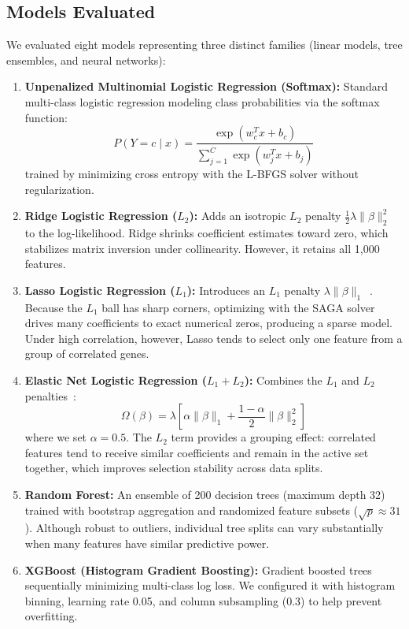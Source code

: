 \documentclass[11pt,a4paper]{article}
\begin{document}
\subsection{Models Evaluated}
We evaluated eight models representing three distinct families (linear models, tree ensembles, and neural networks):
\begin{enumerate}
    \item \textbf{Unpenalized Multinomial Logistic Regression (Softmax):} Standard multi-class logistic regression modeling class probabilities via the softmax function:
    \begin{equation}
        P(Y = c \mid x) = \frac{\exp(w_c^T x + b_c)}{\sum_{j=1}^C \exp(w_j^T x + b_j)}
    \end{equation}
    trained by minimizing cross entropy with the L-BFGS solver without regularization.
    \item \textbf{Ridge Logistic Regression ($L_2$):} Adds an isotropic $L_2$ penalty $\frac{1}{2}\lambda \|\beta\|_2^2$ to the log-likelihood. Ridge shrinks coefficient estimates toward zero, which stabilizes matrix inversion under collinearity. However, it retains all 1,000 features.
    \item \textbf{Lasso Logistic Regression ($L_1$):} Introduces an $L_1$ penalty $\lambda \|\beta\|_1$~\cite{tibshirani1996regression}. Because the $L_1$ ball has sharp corners, optimizing with the SAGA solver drives many coefficients to exact numerical zeros, producing a sparse model. Under high correlation, however, Lasso tends to select only one feature from a group of correlated genes.
    \item \textbf{Elastic Net Logistic Regression ($L_1 + L_2$):} Combines the $L_1$ and $L_2$ penalties~\cite{zou2005regularization}:
    \begin{equation}
        \Omega(\beta) = \lambda \left[ \alpha \|\beta\|_1 + \frac{1 - \alpha}{2} \|\beta\|_2^2 \right]
    \end{equation}
    where we set $\alpha = 0.5$. The $L_2$ term provides a grouping effect: correlated features tend to receive similar coefficients and remain in the active set together, which improves selection stability across data splits.
    \item \textbf{Random Forest:} An ensemble of 200 decision trees (maximum depth 32) trained with bootstrap aggregation and randomized feature subsets ($\sqrt{p} \approx 31$). Although robust to outliers, individual tree splits can vary substantially when many features have similar predictive power.
    \item \textbf{XGBoost (Histogram Gradient Boosting):} Gradient boosted trees~\cite{chen2016xgboost} sequentially minimizing multi-class log loss. We configured it with histogram binning, learning rate 0.05, and column subsampling (0.3) to help prevent overfitting.

\end{enumerate}
\end{document}
